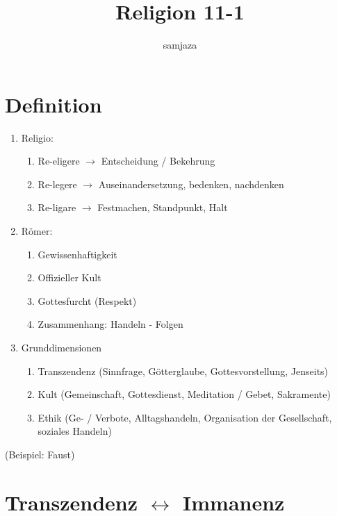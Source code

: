 \documentclass[11pt, paper=a4, twocolumn]{scrartcl}
\title{\vspace{-1.25cm}Religion 11-1\vspace{-0.25cm}}
\date{\vspace{-5ex}}
\author{samjaza}
\begin{document}
	\maketitle


	\section{Definition}

	\begin{enumerate}
		\item Religio:
			\begin{enumerate}
				\item Re-eligere $\rightarrow$ Entscheidung / Bekehrung
				\item Re-legere $\rightarrow$ Auseinandersetzung, bedenken, nachdenken
				\item Re-ligare $\rightarrow$ Festmachen, Standpunkt, Halt
			\end{enumerate}
		\item Römer:
			\begin{enumerate}
				\item Gewissenhaftigkeit
				\item Offizieller Kult
				\item Gottesfurcht (Respekt)
				\item Zusammenhang: Handeln - Folgen
			\end{enumerate}
		\item Grunddimensionen
			\begin{enumerate}
				\item Transzendenz (Sinnfrage, Götterglaube, Gottesvorstellung, Jenseits)
				\item Kult (Gemeinschaft, Gottesdienst, Meditation / Gebet, Sakramente)
				\item Ethik (Ge- / Verbote, Alltagshandeln, Organisation der Gesellschaft, soziales Handeln)
			\end{enumerate}
	\end{enumerate}
(Beispiel: Faust)

	\section{Transzendenz $\leftrightarrow$ Immanenz}
	
\end{document}
